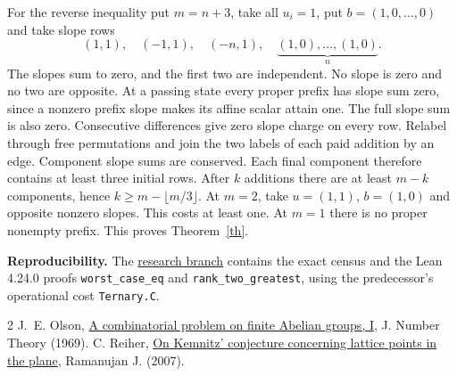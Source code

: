 \documentclass[a4paper,12pt]{article}
\begin{document}
For the reverse inequality put $m=n+3$, take all $u_i=1$, put $b=(1,0,\ldots,0)$ and take slope rows
\[
 (1,1),\quad(-1,1),\quad(-n,1),\quad
 \underbrace{(1,0),\ldots,(1,0)}_{n}.
\]
The slopes sum to zero, and the first two are independent. No slope is zero and no two are opposite. At a passing state every proper prefix has slope sum zero, since a nonzero prefix slope makes its affine scalar attain one. The full slope sum is also zero. Consecutive differences give zero slope charge on every row. Relabel through free permutations and join the two labels of each paid addition by an edge. Component slope sums are conserved. Each final component therefore contains at least three initial rows. After $k$ additions there are at least $m-k$ components, hence $k\ge m-\lfloor m/3\rfloor$. At $m=2$, take $u=(1,1)$, $b=(1,0)$ and opposite nonzero slopes. This costs at least one. At $m=1$ there is no proper nonempty prefix. This proves Theorem~\ref{th}.

\smallskip\noindent\textbf{Reproducibility.} The \href{https://github.com/SHIN09-git/integer-mult-bounds/tree/codex/ternary-guard-affine-quotient/research/monomial-guard-affine-quotient}{research branch} contains the exact census and the Lean 4.24.0 proofs \texttt{worst\_case\_eq} and \texttt{rank\_two\_greatest}, using the predecessor's operational cost \texttt{Ternary.C}.

\begin{thebibliography}{2}\footnotesize
{} J.~E. Olson, \href{https://doi.org/10.1016/0022-314X(69)90021-3}{A combinatorial problem on finite Abelian groups, I}, J. Number Theory (1969).
 C. Reiher, \href{https://www.math.uni-hamburg.de/en/personen/reiher/artikel/Kemnitz.pdf}{On Kemnitz' conjecture concerning lattice points in the plane}, Ramanujan J. (2007).
\end{thebibliography}
\end{document}
